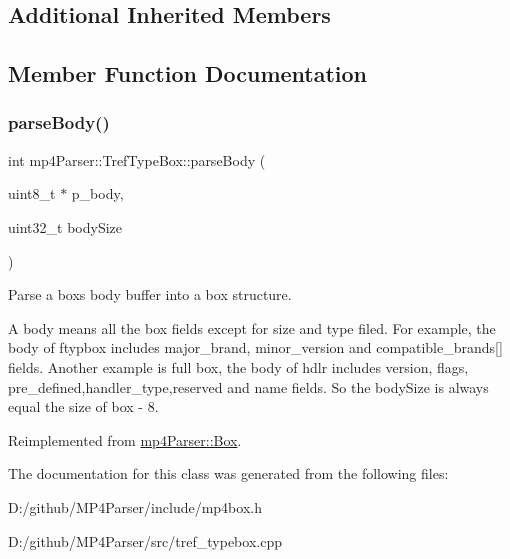 \subsection*{Additional Inherited Members}


\subsection{Member Function Documentation}
\mbox{\label{classmp4_parser_1_1_tref_type_box_aacb791855bbbc8fd86092257f18e9889}} 
\subsubsection{\texorpdfstring{parseBody()}{parseBody()}}
{\footnotesize\ttfamily int mp4\+Parser\+::\+Tref\+Type\+Box\+::parse\+Body (\begin{DoxyParamCaption}\item[{uint8\+\_\+t $\ast$}]{p\+\_\+body,  }\item[{uint32\+\_\+t}]{body\+Size }\end{DoxyParamCaption})\hspace{0.3cm}{\ttfamily [virtual]}}



Parse a box\textquotesingle{}s body buffer into a box structure. 

A body means all the box fields except for size and type filed. For example, the body of ftypbox includes major\+\_\+brand, minor\+\_\+version and compatible\+\_\+brands\mbox{[}\mbox{]} fields. Another example is full box, the body of hdlr includes version, flags, pre\+\_\+defined,handler\+\_\+type,reserved and name fields. So the body\+Size is always equal the size of box -\/ 8. 

Reimplemented from \mbox{\hyperlink{classmp4_parser_1_1_box_a3dd0c084ac65bc77b69ac5ecaf796cb2}{mp4\+Parser\+::\+Box}}.



The documentation for this class was generated from the following files\+:\begin{DoxyCompactItemize}
\item 
D\+:/github/\+M\+P4\+Parser/include/mp4box.\+h\item 
D\+:/github/\+M\+P4\+Parser/src/tref\+\_\+typebox.\+cpp\end{DoxyCompactItemize}
